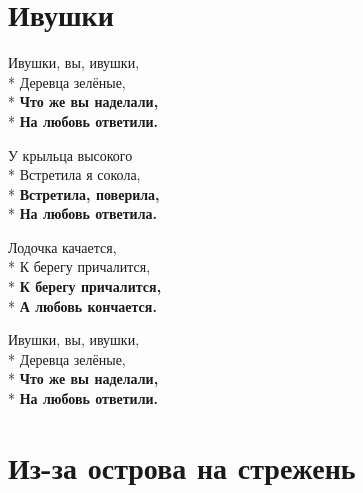 \section{Ивушки}
\label{song:Ивушки}

\medskip

\begin{minipage}{\linewidth}
Ивушки, вы, ивушки,\\*
Деревца зелёные,\\*
\textbf{Что же вы наделали,}\\*
\textbf{На любовь ответили.}\\
\end{minipage}\par\medskip\nobreak

\medskip

\begin{minipage}{\linewidth}
У крыльца высокого\\*
Встретила я сокола,\\*
\textbf{Встретила, поверила,}\\*
\textbf{На любовь ответила.}\\
\end{minipage}\par\medskip\nobreak

\medskip

\begin{minipage}{\linewidth}
Лодочка качается,\\*
К берегу причалится,\\*
\textbf{К берегу причалится,}\\*
\textbf{А любовь кончается.}\\
\end{minipage}\par\medskip\nobreak

\medskip

\begin{minipage}{\linewidth}
Ивушки, вы, ивушки,\\*
Деревца зелёные,\\*
\textbf{Что же вы наделали,}\\*
\textbf{На любовь ответили.}\\
\end{minipage}

\vspace{\fill}\newpage

\section{Из-за острова на стрежень}
\label{song:Из-за_острова_на_стрежень}

